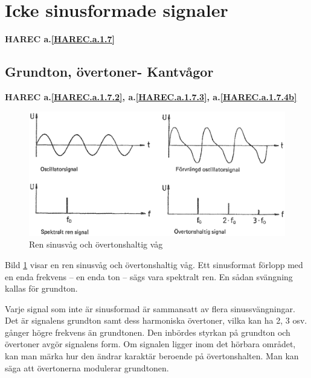 \section{Icke sinusformade signaler}
\textbf{HAREC a.\ref{HAREC.a.1.7}\label{myHAREC.a.1.7}}

\subsection{Grundton, övertoner- Kantvågor}
\textbf{HAREC a.\ref{HAREC.a.1.7.2}, a.\ref{HAREC.a.1.7.3}, a.\ref{HAREC.a.1.7.4b}\label{myHAREC.a.1.7.2}\label{myHAREC.a.1.7.3}\label{myHAREC.a.1.7.4b}}

\begin{figure}
\begin{center}
\includegraphics[width=\textwidth]{images/cropped_pdfs/bild_2_1-18.pdf}
\caption{Ren sinusvåg och övertonshaltig våg}
\label{fig:BildII1-18}
\end{center}
\end{figure}

Bild \ref{fig:BildII1-18} visar en ren sinusvåg och övertonshaltig våg.
Ett sinusformat förlopp med en enda frekvens -- en enda ton -- sägs vara
spektralt ren.
En sådan svängning kallas för grundton.

Varje signal som inte är sinusformad är sammansatt av flera sinussvängningar.
Det är signalens grundton samt dess harmoniska övertoner, vilka kan ha 2, 3
osv. gånger högre frekvens än grundtonen.
Den inbördes styrkan på grundton och övertoner avgör signalens form.
Om signalen ligger inom det hörbara området, kan man märka hur den ändrar
karaktär beroende på övertonshalten.
Man kan säga att övertonerna modulerar grundtonen.

